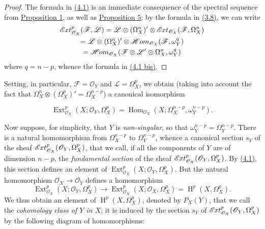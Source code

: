 \documentclass{article}
\newenvironment{eqenv}
  {}
  {}
\newcommand{\oldpage}[1]{\marginpar{\footnotesize$\Big\vert$ \textit{p.~#1}}}
\theoremstyle{definition}
\theoremstyle{definition}
\theoremstyle{definition}
\theoremstyle{definition}
\theoremstyle{remark}
\begin{document}
\begin{proof}
The formula in \protect\hyperlink{fga-1-equation-4.1}{(4.1)} is an immediate consequence of the spectral sequence from \protect\hyperlink{fga-1-proposition-1}{Proposition 1}, as well as \protect\hyperlink{fga-1-proposition-5}{Proposition 5};
by the formula in \protect\hyperlink{fga-1-equation-3.8}{(3.8)}, we can write
\[
  \begin{gathered}
    \mathscr{E}\kern -.5pt xt_{{\mathscr{O}}_X}^p({\mathscr{F}},{\mathscr{L}})
    = {\mathscr{L}}\otimes(\Omega_X^n)'\otimes\mathscr{E}\kern -.5pt xt_{{\mathscr{O}}_X}({\mathscr{F}},\Omega_X^n)
  \\= {\mathscr{L}}\otimes(\Omega_X^n)'\otimes\mathscr{H}\kern -.5pt om_{{\mathscr{O}}_X}({\mathscr{F}},\omega_Y^q)
  \\= \mathscr{H}\kern -.5pt om_{{\mathscr{O}}_X}({\mathscr{F}}\otimes{\mathscr{L}}'\otimes\Omega_X^n,\omega_Y^q)
  \end{gathered}
\]
where \(q=n-p\), whence the formula in \protect\hyperlink{fga-1-equation-4.1bis}{(4.1 bis)}.
\end{proof}

\oldpage{149-10}Setting, in particular, \({\mathscr{F}}={\mathscr{O}}_Y\) and \({\mathscr{L}}=\Omega_X^p\), we obtain (taking into account the fact that \(\Omega_X^n\otimes(\Omega_X^p)'=\Omega_X^{n-p}\)) a canonical isomorphism

\leavevmode{}%
\begin{eqenv}
\[
  \operatorname{Ext}_{{\mathscr{O}}_X}^p(X;{\mathscr{O}}_Y,\Omega_X^p) = \operatorname{Hom}_{{\mathscr{O}}_X}(X;\Omega_X^{n-p},\omega_Y^{n-p}).
\tag{4.2}
\]

\end{eqenv}

Now suppose, for simplicity, that \(Y\) is \emph{non-singular}, so that \(\omega_Y^{n-p}=\Omega_Y^{n-p}\).
There is a natural homomorphism from \(\Omega_X^{n-p}\) to \(\Omega_Y^{n-p}\), whence a canonical section \(s_Y\) of the sheaf \(\mathscr{E}\kern -.5pt xt_{{\mathscr{O}}_X}^p({\mathscr{O}}_Y,\Omega_X^p)\), that we call, if all the components of \(Y\) are of dimension \(n-p\), the \emph{fundamental section} of the sheaf \(\mathscr{E}\kern -.5pt xt_{{\mathscr{O}}_X}^p({\mathscr{O}}_Y,\Omega_X^p)\).
By \protect\hyperlink{fga-1-equation-4.1}{(4.1)}, this section defines an element of \(\operatorname{Ext}_{{\mathscr{O}}_X}^p(X;{\mathscr{O}}_Y,\Omega_X^p)\).
But the natural homomorphism \({\mathscr{O}}_X\to{\mathscr{O}}_Y\) defines a homomorphism
\[
  \operatorname{Ext}_{{\mathscr{O}}_X}^p(X;{\mathscr{O}}_Y,\Omega_X^p) \to \operatorname{Ext}_{{\mathscr{O}}_X}^p(X;{\mathscr{O}}_X,\Omega_X^p) = \operatorname{H}^p(X,\Omega_X^p).
\]
We thus obtain an element of \(\operatorname{H}^p(X,\Omega_X^p)\), denoted by \(P_X(Y)\), that we call the \emph{cohomology class of \(Y\) in \(X\)};
it is induced by the section \(s_Y\) of \(\mathscr{E}\kern -.5pt xt_{{\mathscr{O}}_X}^p({\mathscr{O}}_Y,\Omega_X^p)\) by the following diagram of homomorphisms:
\end{document}
